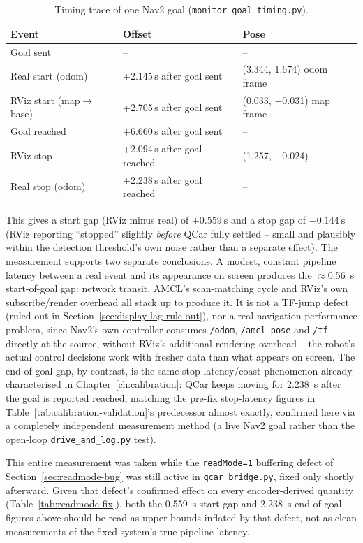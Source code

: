 \begin{table}[htbp]
  \centering
  \caption{Timing trace of one Nav2 goal (\texttt{monitor\_goal\_timing.py}).}
  \label{tab:display-lag}
  \begin{tabular}{@{}lll@{}}
    \toprule
    Event & Offset & Pose \\
    \midrule
    Goal sent & -- & -- \\
    Real start (odom) & +2.145\,s after goal sent & (3.344, 1.674) odom frame \\
    RViz start (map$\to$base) & +2.705\,s after goal sent & (0.033, $-$0.031) map frame \\
    Goal reached & +6.660\,s after goal sent & -- \\
    RViz stop & +2.094\,s after goal reached & (1.257, $-$0.024) \\
    Real stop (odom) & +2.238\,s after goal reached & -- \\
    \bottomrule
  \end{tabular}
\end{table}

This gives a start gap (RViz minus real) of $+\SI{0.559}{\second}$ and
a stop gap of $-\SI{0.144}{\second}$ (RViz reporting ``stopped''
slightly \emph{before} QCar fully settled -- small and plausibly
within the detection threshold's own noise rather than a separate
effect). The measurement supports two separate conclusions. A modest,
constant pipeline latency between a real event and its appearance on
screen produces the $\approx$\SI{0.56}{\second} start-of-goal gap:
network transit, AMCL's scan-matching cycle and RViz's own
subscribe/render overhead all stack up to produce it. It is not a
TF-jump defect (ruled out in Section~\ref{sec:display-lag-rule-out}),
nor a real navigation-performance problem, since
Nav2's own controller consumes \texttt{/odom}, \texttt{/amcl\_pose} and
\texttt{/tf} directly at the source, without RViz's additional rendering overhead
-- the robot's actual control decisions work with fresher data than
what appears on screen. The end-of-goal gap, by contrast, is the same
stop-latency/coast phenomenon already characterised in
Chapter~\ref{ch:calibration}: QCar keeps moving for
\SI{2.238}{\second} after the goal is reported reached, matching the
pre-fix stop-latency figures in
Table~\ref{tab:calibration-validation}'s predecessor almost exactly,
confirmed here via a completely independent measurement method (a
live Nav2 goal rather than the open-loop \texttt{drive\_and\_log.py}
test).

This entire measurement was taken while the \texttt{readMode=1}
buffering defect of Section~\ref{sec:readmode-bug} was still active in
\texttt{qcar\_bridge.py}, fixed only shortly afterward. Given that
defect's confirmed effect on every encoder-derived quantity
(Table~\ref{tab:readmode-fix}), both the \SI{0.559}{\second} start-gap
and \SI{2.238}{\second} end-of-goal figures above should be read as
upper bounds inflated by that defect, not as clean measurements of the
fixed system's true pipeline latency.

